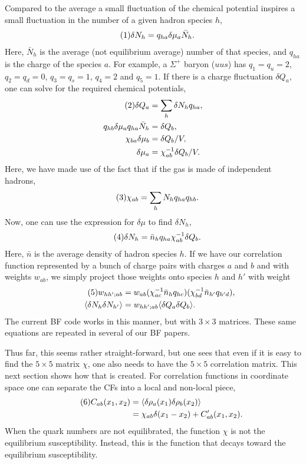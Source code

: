 \documentclass[12pt]{article}
\numberwithin{equation}{section}
\numberwithin{figure}{section}
\newcommand\eqnumber{\addtocounter{equation}{1}\tag{\theequation}}
\begin{document}
Compared to the average a small fluctuation of the chemical potential inspires a small fluctuation in the number of a given hadron species $h$,
\begin{align*}\eqnumber
\delta N_h&=q_{ha}\delta\mu_a \bar{N}_h.
\end{align*}
Here, $\bar{N}_h$ is the average (not equilibrium average) number of that species, and $q_{ha}$ is the charge of the species $a$. For example, a $\Sigma^+$ baryon ($uus$) has $q_1=q_u=2$, $q_2=q_d=0$, $q_3=q_s=1$, $q_4=2$ and $q_5=1$. If there is a charge fluctuation $\delta Q_a$, one can solve for the required chemical potentials,
\begin{align*}\eqnumber
\delta Q_a&=\sum_h\delta N_hq_{ha},\\
q_{hb}\delta\mu_aq_{ha}\bar{N}_h&=\delta Q_b,\\
\chi_{ba}\delta\mu_b&=\delta Q_b/V,\\
\delta\mu_a&=\chi^{-1}_{ab}\delta Q_b/V.
\end{align*}
Here, we have made use of the fact that if the gas is made of independent hadrons,
\begin{align*}\eqnumber
\chi_{ab}&=\sum_hN_hq_{ha}q_{hb}.
\end{align*}
Now, one can use the expression for $\delta\mu$ to find $\delta N_h$,
\begin{align*}\eqnumber\label{eq:deltaNvsdeltaQ}
\delta N_h&=\bar{n}_hq_{ha}\chi^{-1}_{ab}\delta Q_b.
\end{align*}
Here, $\bar{n}$ is the average density of hadron species $h$. If we have our correlation function represented by a bunch of charge pairs with charges $a$ and $b$ and with weights $w_{ab}$, we simply project those weights onto species $h$ and $h'$ with weight
\begin{align*}\eqnumber
w_{hh';ab}&=w_{ab}(\chi^{-1}_{ac}\bar{n}_hq_{hc})(\chi^{-1}_{bd}\bar{n}_{h'}q_{h'd}),\\
\label{eq:dNdN}
\langle\delta N_h\delta N_{h'}\rangle&=w_{hh';ab}\langle \delta Q_a\delta Q_b\rangle.
\end{align*}
The current BF code works in this manner, but with $3\times 3$ matrices. These same equations are repeated in several of our BF papers.

Thus far, this seems rather straight-forward, but one sees that even if it is easy to find the $5\times 5$ matrix $\chi$, one also needs to have the $5\times 5$ correlation matrix. This next section shows how that is created. For correlation functions in coordinate space one can separate the CFs into a local and non-local piece,
\begin{align*}\eqnumber
C_{ab}(x_1,x_2)&=\langle\delta\rho_a(x_1)\delta\rho_b(x_2)\rangle\\
&=\chi_{ab}\delta(x_1-x_2)+C'_{ab}(x_1,x_2).
\end{align*}
When the quark numbers are not equilibrated, the function $\chi$ is not the equilibrium susceptibility. Instead, this is the function that decays toward the equilibrium susceptibility. 
\end{document}
